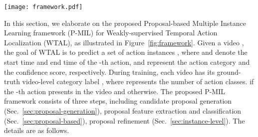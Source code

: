 


\begin{figure*}[ht]
    \centering
\texttt{[image: framework.pdf]}
\caption{
(a) Overview of the proposed Proposal-based Multiple Instance Learning framework, which consists of candidate proposal generation, proposal feature extraction, proposal classification and refinement.
(b) The Surrounding Contrastive Feature Extraction (SCFE) module extends the boundaries of the candidate proposals and then calculates the outer-inner contrastive features of the candidate proposals.
    (c) The Proposal Completeness Evaluation (PCE) module generates the completeness pseudo label by computing the IoU with the selected pseudo instances.
    (d) The Instance-level Rank Consistency (IRC) loss constrains the normalized relative classification scores within the cluster between RGB and FLOW modalities to be consistent.
    }
    \label{fig:framework}
\end{figure*}

In this section, we elaborate on the proposed Proposal-based Multiple Instance Learning framework (P-MIL) for Weakly-supervised Temporal Action Localization (WTAL),
as illustrated in Figure~\ref{fig:framework}.
Given a video , the goal of WTAL is to predict a set of action instances ,
where  and  denote the start time and end time of the -th action,
 and  represent the action category and the confidence score, respectively.
During training, each video  has its ground-truth video-level category label ,
where  represents the number of action classes.
 if the -th action presents in the video and  otherwise.
The proposed P-MIL framework consists of three steps,
including candidate proposal generation (Sec.~\ref{sec:proposal-generation}),
proposal feature extraction and classification (Sec.~\ref{sec:proposal-based}),
proposal refinement (Sec.~\ref{sec:instance-level}).
The details are as follows.







